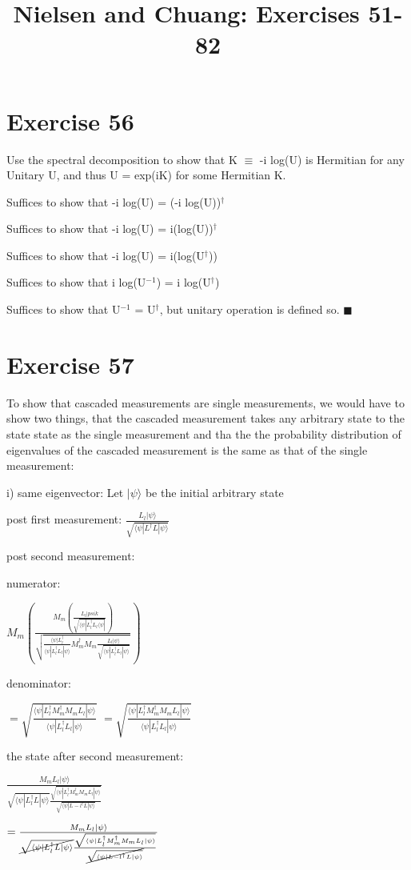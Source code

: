\documentclass{article}
\newcommand{\0}{{$|0\rangle$}}
\newcommand{\1}{{$|1\rangle$}}
\newcommand{\2}{\frac{1}{\sqrt{2}}}
\newcommand{\psik}{|\psi\rangle}
\newcommand{\psib}{\langle\psi|}
\begin{document}
\title{Nielsen and Chuang: Exercises 51-82}
\section*{Exercise 56}
Use the spectral decomposition to show that K $\equiv$ -i log(U) is Hermitian for any Unitary U, and thus U = exp(iK) for some Hermitian K.

Suffices to show that -i log(U) = (-i log(U))$^\dag$

Suffices to show that -i log(U) = i(log(U))$^\dag$

Suffices to show that -i log(U) = i(log(U$^\dag$))

Suffices to show that i log(U$^{-1}$) = i log(U$^\dag$)

Suffices to show that U$^{-1}$ = U$^\dag$, but unitary operation is defined so. 
$\blacksquare$

\newpage
\section*{Exercise 57}
To show that cascaded measurements are single measurements, we would have to show two things, that the cascaded measurement takes any arbitrary state to the state state as the single measurement and tha the the probability distribution of eigenvalues of the cascaded measurement is the same as that of the single measurement:

i) same eigenvector:
Let $\psik$ be the initial arbitrary state

post first measurement: $\frac{L_l \psik}{\sqrt{\psib L^\dag L \psik}}$

post second measurement:

numerator:

$M_m (\frac{M_m (\frac{L_l |psik}{\sqrt{\psib L_l^\dag L_l \psib}})}{\sqrt{\frac{\psib L_l^\dag}{\psib L_l^\dag L_l \psik} M_m^\dag M_m \frac{L_l \psik}{\sqrt{\psib L_l^\dag L_l \psik}}}})$

denominator:

$ = \sqrt{\frac{\psib L_l^\dag M_m^\dag M_m L_l \psik}{\psib L_l^\dag L_l \psik}} $
$ = \sqrt{\frac{\psib L_l^\dag M_m^\dag M_m L_l \psik}{\psib L_l^\dag L_l \psik}}$

the state after second measurement:

$\frac{M_m L_l \psik}{\sqrt{\psib L_l^\dag L \psik} \frac{\sqrt{\psib L_l^\dag M_m^\dag M_m L_l \psik}}{\sqrt{\psib L-l^\dag L \psik}}}$

$ = \frac{M_m L_l \psik}{\cancel{\sqrt{\psib L_l^\dag L \psik}} \frac{\sqrt{\psib L_l^\dag M_m^\dag M_m L_l \psik}}{\cancel{\sqrt{\psib L-l^\dag L \psik}}}}$
\end{document}
